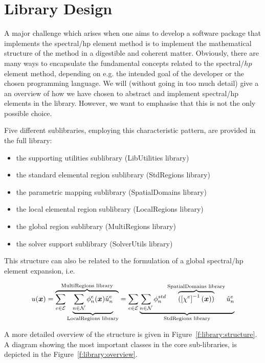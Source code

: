 \chapter{Library Design}

A major challenge which arises when one aims to develop a software package that
implements the spectral/hp element method is to implement the mathematical
structure of the method in a digestible and coherent matter. Obviously, there
are many ways to encapsulate the fundamental concepts related to the
spectral/$hp$ element method, depending on e.g. the intended goal of the
developer or the chosen programming language. We will (without going in too much
detail) give a an overview of how we have chosen to abstract and implement
spectral/hp elements in the \nekpp library. However, we want to emphasise that
this is not the only possible choice.

Five different sublibraries, employing this characteristic pattern, are provided
in the full \nekpp library:

\begin{itemize}
\item the supporting utilities sublibrary (LibUtilities library)
\item the standard elemental region sublibrary (StdRegions library)
\item the parametric mapping sublibrary (SpatialDomains library)
\item the local elemental region sublibrary (LocalRegions library)
\item the global region sublibrary (MultiRegions library)
\item the solver support sublibrary (SolverUtils library)
\end{itemize}

This structure can also be related to the formulation of a global spectral/hp
element expansion, i.e.

\begin{align*}
  u(\boldsymbol{x})=\overbrace{\sum_{e\in\mathcal{E}}\underbrace{\sum_{n\in\mathcal{N}}\phi^e_n(\boldsymbol{x})\hat{u}^e_n}_{\mbox{\scriptsize{LocalRegions
  library}}}}^{\mbox{\scriptsize{MultiRegions
  library}}}=\sum_{e\in\mathcal{E}}\underbrace{\sum_{n\in\mathcal{N}}\phi^{std}_n\overbrace{(\left[\chi^e\right]^{-1}(\boldsymbol{x}))}^{\mbox{\scriptsize{SpatialDomains
  library}}}\hat{u}^e_n}_{\mbox{\scriptsize{StdRegions library}}}
\end{align*}

A more detailed overview of the \nekpp structure is given in
Figure~\ref{f:library:structure}. A diagram showing the most important classes
in the core sub-libraries, is depicted in the Figure~\ref{f:library:overview}.

